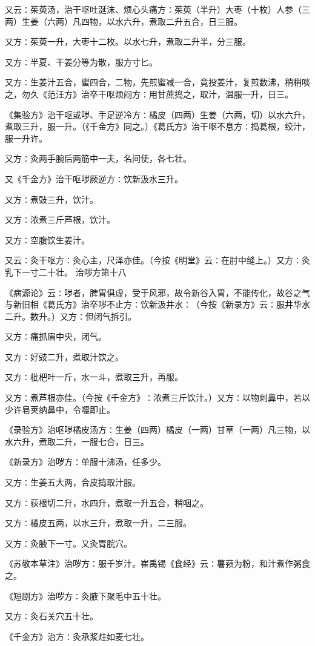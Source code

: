 \documentclass[a4paper,12pt,UTF8,twoside]{ctexbook}
\begin{document}
又云∶茱萸汤，治干呕吐涎沫、烦心头痛方∶茱萸（半升）大枣（十枚）人参（三两）生姜（六两）凡四物，以水六升，煮取二升五合，日三服。

又方∶茱萸一升，大枣十二枚。以水七升，煮取二升半，分三服。

又方∶半夏、干姜分等为散，服方寸匕。

又方∶生姜汁五合，蜜四合，二物，先煎蜜减一合，竟投姜汁，复煎数沸，稍稍啖之，勿久《范汪方》治卒干呕烦闷方∶用甘蔗捣之，取汁，温服一升，日三。

《集验方》治干呕或哕、手足逆冷方∶橘皮（四两）生姜（六两，切）以水六升，煮取三升，服一升。（《千金方》同之。）《葛氏方》治干呕不息方∶捣葛根，绞汁，服一升许。

又方∶灸两手腕后两筋中一夫，名间使，各七壮。

又《千金方》治干呕哕厥逆方∶饮新汲水三升。

又方∶煮豉三升，饮汁。

又方∶浓煮三斤芦根，饮汁。

又方∶空腹饮生姜汁。

又云∶灸干呕方∶灸心主，尺泽亦佳。（今按《明堂》云∶在肘中缝上。）又方∶灸乳下一寸二十壮。
治哕方第十八

《病源论》云∶哕者，脾胃俱虚，受于风邪，故令新谷入胃，不能传化，故谷之气与新旧相《葛氏方》治卒哕不止方∶饮新汲井水∶（今按《新录方》云∶服井华水二升。数升。）又方∶但闭气拆引。

又方∶痛抓眉中央，闭气。

又方∶好豉二升，煮取汁饮之。

又方∶枇杷叶一斤，水一斗，煮取三升，再服。

又方∶煮芦根亦佳。（今按《千金方》∶浓煮三斤饮汁。）又方∶以物刺鼻中，若以少许皂荚纳鼻中，令嚏即止。

《录验方》治呕哕橘皮汤方∶生姜（四两）橘皮（一两）甘草（一两）凡三物，以水六升，煮取二升，一服七合，日三。

《新录方》治哕方∶单服十沸汤，任多少。

又方∶生姜五大两，合皮捣取汁服。

又方∶荻根切二升，水四升，煮取一升五合，稍咽之。

又方∶橘皮五两，以水三升，煮取一升，二三服。

又方∶灸腋下一寸。又灸胃脘穴。

《苏敬本草注》治哕方∶服千岁汁。崔禹锡《食经》云∶薯蓣为粉，和汁煮作粥食之。

《短剧方》治哕方∶灸腋下聚毛中五十壮。

又方∶灸石关穴五十壮。

《千金方》治方∶灸承浆炷如麦七壮。
\end{document}
